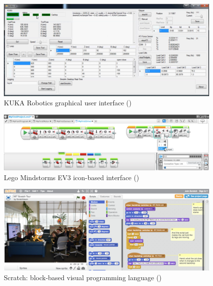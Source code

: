 \begin{figure}[!h]
	\centering
	\includegraphics[width=\linewidth]{figures/kuka-interface2}
	\caption{KUKA Robotics graphical user interface (\cite{abdeetedal2017kuka})}
	\label{fig:Kuka}
\end{figure} 
\begin{figure}[!h]
\centering
\includegraphics[width=\linewidth]{figures/lego-mindstorm2}
\caption{Lego Mindstorms EV3 icon-based interface (\cite{lego2003})}
\label{fig:lego-mindstorm}
\end{figure} 
\begin{figure}[h]
	\centering
	\includegraphics[width=\linewidth]{figures/scratch-interface}
	\caption{Scratch: block-based visual programming language (\cite{majed2014learn})}
	\label{fig:scratch-interface}
\end{figure} 

